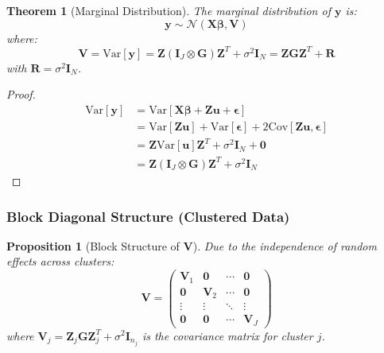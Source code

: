 \documentclass{article}
\newtheorem{theorem}{Theorem}
\newtheorem{proposition}{Proposition}
\begin{document}
\begin{theorem}[Marginal Distribution]
The marginal distribution of $\mathbf{y}$ is:
\begin{equation}
\mathbf{y} \sim \mathcal{N}(\mathbf{X}\boldsymbol{\beta}, \mathbf{V})
\end{equation}
where:
\begin{equation}
\mathbf{V} = \text{Var}[\mathbf{y}] = \mathbf{Z}(\mathbf{I}_J \otimes \mathbf{G})\mathbf{Z}^T + \sigma^2\mathbf{I}_N = \mathbf{ZGZ}^T + \mathbf{R}
\end{equation}
with $\mathbf{R} = \sigma^2\mathbf{I}_N$.
\end{theorem}

\begin{proof}
\begin{align}
\text{Var}[\mathbf{y}] &= \text{Var}[\mathbf{X}\boldsymbol{\beta} + \mathbf{Z}\mathbf{u} + \boldsymbol{\epsilon}] \\
&= \text{Var}[\mathbf{Z}\mathbf{u}] + \text{Var}[\boldsymbol{\epsilon}] + 2\text{Cov}[\mathbf{Z}\mathbf{u}, \boldsymbol{\epsilon}] \\
&= \mathbf{Z}\text{Var}[\mathbf{u}]\mathbf{Z}^T + \sigma^2\mathbf{I}_N + \mathbf{0} \\
&= \mathbf{Z}(\mathbf{I}_J \otimes \mathbf{G})\mathbf{Z}^T + \sigma^2\mathbf{I}_N
\end{align}
\end{proof}

\subsubsection{Block Diagonal Structure (Clustered Data)}

\begin{proposition}[Block Structure of $\mathbf{V}$]
Due to the independence of random effects across clusters:
\begin{equation}
\mathbf{V} = \begin{pmatrix}
\mathbf{V}_1 & \mathbf{0} & \cdots & \mathbf{0} \\
\mathbf{0} & \mathbf{V}_2 & \cdots & \mathbf{0} \\
\vdots & \vdots & \ddots & \vdots \\
\mathbf{0} & \mathbf{0} & \cdots & \mathbf{V}_J
\end{pmatrix}
\end{equation}
where $\mathbf{V}_j = \mathbf{Z}_j\mathbf{G}\mathbf{Z}_j^T + \sigma^2\mathbf{I}_{n_j}$ is the covariance matrix for cluster $j$.
\end{proposition}
\end{document}
